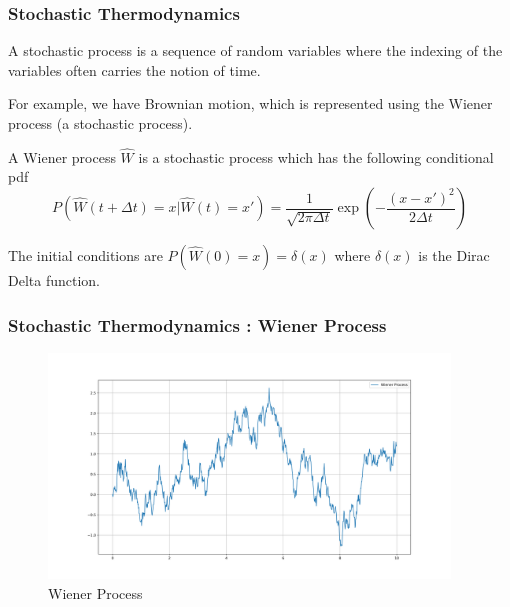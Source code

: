 \documentclass{beamer}
\begin{document}
\begin{frame}
  \frametitle{Stochastic Thermodynamics}
  \begin{definition}

    A stochastic process is a sequence of random variables where the indexing of the variables
    often carries the notion of time.

  \end{definition}
  For example, we have Brownian motion, which is represented using the Wiener process
  (a stochastic process).
  \begin{definition}
    A Wiener process $\hat{W}$ is a stochastic process which has the following conditional pdf
    \begin{displaymath}
      P(\hat{W}(t+\Delta t)=x | \hat{W}(t)=x') = \frac{1}{\sqrt{2 \pi \Delta t}}\exp(-\frac{(x-x')^2}{2 \Delta t})
    \end{displaymath}

  \end{definition}
  The initial conditions are $P(\hat{W}(0) = x) = \delta(x)$ where $\delta(x)$ is the Dirac Delta
  function.
\end{frame}

\begin{frame}
  \frametitle{Stochastic Thermodynamics : Wiener Process}
  \begin{figure}
    \begin{center}
      \includegraphics[width=0.95\textwidth]{"../code/WienerProcess.png"}
    \end{center}
    \caption{Wiener Process}\label{fig:1}
  \end{figure}
  
\end{frame}
\end{document}
